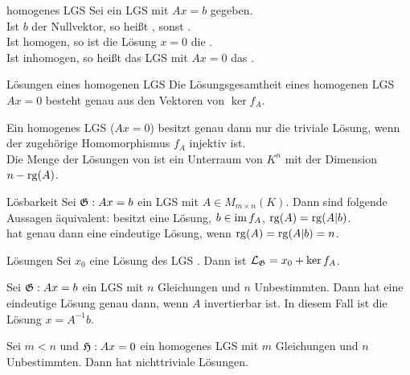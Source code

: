 \begin{Def}{homogenes LGS}
    Sei ein LGS  mit $Ax = b$ gegeben. \\
    Ist $b$ der Nullvektor, so heißt  ,
    sonst . \\
    Ist  homogen, so ist die Lösung $x = 0$ die
    . \\
    Ist  inhomogen, so heißt das LGS  mit $Ax = 0$ das
    .
\end{Def}

\begin{Satz}{Lösungen eines homogenen LGS}
    Die Lösungsgesamtheit eines homogenen LGS $Ax = 0$ besteht genau aus
    den Vektoren von $\ker f_A$.
\end{Satz}

\begin{Kor}
    Ein homogenes LGS  ($Ax = 0$) besitzt genau dann nur die triviale
    Lösung, wenn der zugehörige Homomorphismus $f_A$ injektiv ist. \\
    Die Menge der Lösungen von  ist ein Unterraum von $K^n$ mit der
    Dimension $n - \operatorname{rg}(A)$.
\end{Kor}

\begin{Satz}{Lösbarkeit}
    Sei $\mathfrak{G}: Ax = b$ ein LGS mit $A \in M_{m \times n}(K)$.
    Dann sind folgende Aussagen äquivalent: \qquad
     besitzt eine Lösung, \qquad $b \in \operatorname{im} f_A$, \qquad
    $\operatorname{rg}(A) = \operatorname{rg}(A|b)$. \\
     hat genau dann eine eindeutige Lösung, wenn
    $\operatorname{rg}(A) = \operatorname{rg}(A|b) = n$.
\end{Satz}

\begin{Satz}{Lösungen}
    Sei $x_0$ eine Lösung des LGS .
    Dann ist $\mathcal{L}_{\mathfrak{G}} = x_0 + \ker f_A$.
\end{Satz}

\begin{Kor}
    Sei $\mathfrak{G}: Ax = b$ ein LGS mit $n$ Gleichungen und $n$ Unbestimmten.
    Dann hat  eine eindeutige Lösung genau dann, wenn $A$ invertierbar
    ist.
    In diesem Fall ist die Lösung $x = A^{-1}b$.
\end{Kor}

\begin{Kor}
    Sei $m < n$ und $\mathfrak{H}: Ax = 0$ ein homogenes LGS mit $m$ Gleichungen
    und $n$ Unbestimmten.
    Dann hat  nichttriviale Lösungen.
\end{Kor}

